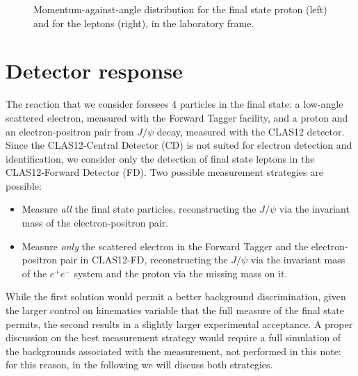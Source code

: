 \documentclass[a4paper,10pt]{article}
\begin{document}
\begin{figure}[tpb]
\caption{\footnotesize \label{fig:2} Momentum-against-angle distribution for the final state proton (left) and for the leptons (right), in the laboratory frame.}
\end{figure}


\section{Detector response}

The reaction that we consider foresees 4 particles in the final state: a low-angle scattered electron, measured with the Forward Tagger facility, and a proton and an electron-positron pair from $J/\psi$ decay, measured with the CLAS12 detector. Since the CLAS12-Central Detector (CD) is not suited for electron detection and identification, we consider only the detection of final state leptons in the CLAS12-Forward Detector (FD). Two possible measurement strategies are possible:
\begin{itemize}
\item{Measure \textit{all} the final state particles, reconstructing the $J/\psi$ via the invariant mass of the electron-positron pair.}
\item{Measure \textit{only} the scattered electron in the Forward Tagger and the electron-positron pair in CLAS12-FD, reconstructing the $J/\psi$ via the invariant mass of the $e^{+} e^{-}$ system and the proton via the missing mass on it.}
\end{itemize} 
While the first solution would permit a better background discrimination, given the larger control on kinematics variable that the full measure of the final state permits, the second results in a slightly larger experimental acceptance. A proper discussion on the best measurement strategy would require a full simulation of the backgrounds associated with the measurement, not performed in this note: for this reason, in the following we will discuss both strategies. 
\end{document}
